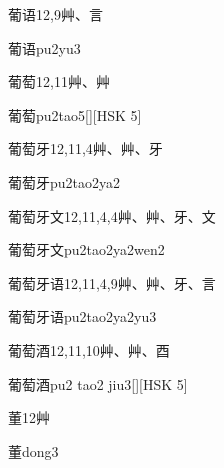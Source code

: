 \begin{Entry}{葡语}{12,9}{⾋、⾔}
  \begin{Phonetics}{葡语}{pu2yu3}
  \end{Phonetics}
\end{Entry}

\begin{Entry}{葡萄}{12,11}{⾋、⾋}
  \begin{Phonetics}{葡萄}{pu2tao5}[][HSK 5]
  \end{Phonetics}
\end{Entry}

\begin{Entry}{葡萄牙}{12,11,4}{⾋、⾋、⽛}
  \begin{Phonetics}{葡萄牙}{pu2tao2ya2}
  \end{Phonetics}
\end{Entry}

\begin{Entry}{葡萄牙文}{12,11,4,4}{⾋、⾋、⽛、⽂}
  \begin{Phonetics}{葡萄牙文}{pu2tao2ya2wen2}
  \end{Phonetics}
\end{Entry}

\begin{Entry}{葡萄牙语}{12,11,4,9}{⾋、⾋、⽛、⾔}
  \begin{Phonetics}{葡萄牙语}{pu2tao2ya2yu3}
  \end{Phonetics}
\end{Entry}

\begin{Entry}{葡萄酒}{12,11,10}{⾋、⾋、⾣}
  \begin{Phonetics}{葡萄酒}{pu2 tao2 jiu3}[][HSK 5]
  \end{Phonetics}
\end{Entry}

\begin{Entry}{董}{12}{⾋}
  \begin{Phonetics}{董}{dong3}
  \end{Phonetics}
\end{Entry}

